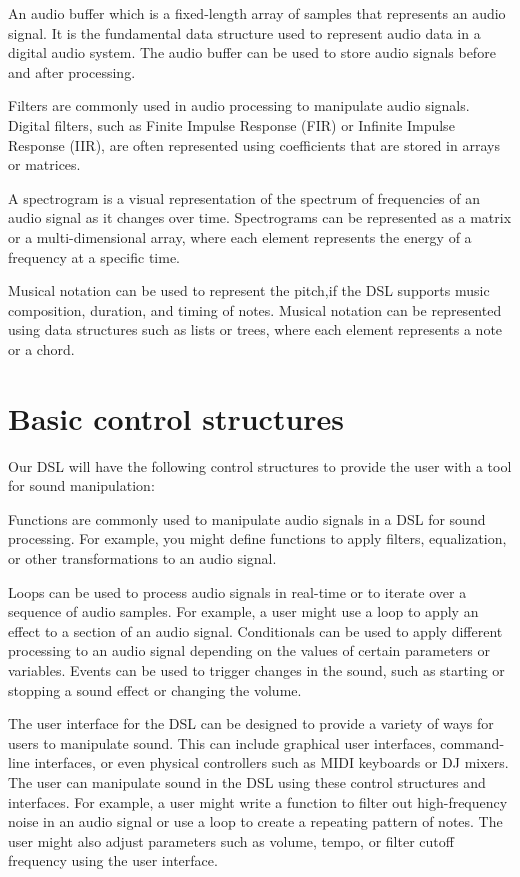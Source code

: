 An audio buffer which is a fixed-length array of samples that 
represents an audio signal. It is the fundamental data structure 
used to represent audio data in a digital audio system. The audio 
buffer can be used to store audio signals before and after 
processing.

Filters are commonly used in audio processing to manipulate audio 
signals. Digital filters, such as Finite Impulse Response (FIR) or 
Infinite Impulse Response (IIR), are often represented using 
coefficients that are stored in arrays or matrices.

A spectrogram is a visual representation of the spectrum of 
frequencies of an audio signal as it changes over time. Spectrograms 
can be represented as a matrix or a multi-dimensional array, where 
each element represents the energy of a frequency at a specific 
time.

Musical notation can be used to represent the pitch,if the DSL 
supports music composition, duration, and timing of notes. Musical 
notation can be represented using data structures such as lists or 
trees, where each element represents a note or a chord.

\section{Basic control structures}
Our DSL will have the following control structures to provide the 
user with a tool for sound manipulation:

Functions are commonly used to manipulate audio signals in a DSL 
for sound processing. For example, you might define functions to 
apply filters, equalization, or other transformations to an audio 
signal.

Loops can be used to process audio signals in real-time or to 
iterate over a sequence of audio samples. For example, a user might 
use a loop to apply an effect to a section of an audio signal.
Conditionals can be used to apply different processing to an audio 
signal depending on the values of certain parameters or 
variables. Events can be used to trigger changes in the sound, such 
as starting or stopping a sound effect or changing the volume.

The user interface for the DSL can be designed to provide a 
variety of ways for users to manipulate sound. This can include 
graphical user interfaces, command-line interfaces, or even 
physical controllers such as MIDI keyboards or DJ mixers.
The user can manipulate sound in the DSL using these control 
structures and interfaces. For example, a user might write a 
function to filter out high-frequency noise in an audio signal or 
use a loop to create a repeating pattern of notes. The user might 
also adjust parameters such as volume, tempo, or filter cutoff 
frequency using the user interface.

